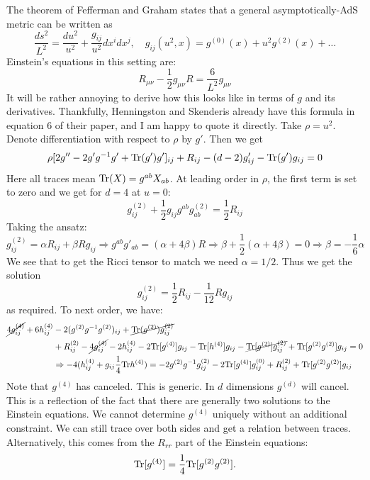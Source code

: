 \documentclass[11pt, class=article, crop=false]{standalone}
\begin{document}
\begin{enumerate}
	 The theorem of Fefferman and Graham states that a general asymptotically-AdS metric can be written as
	\[
		\frac{ds^2}{L^2} = \frac{du^2}{u^2} + \frac{g_{ij}}{u^2} dx^i dx^j, \quad g_{ij}(u^2, x) = g^{(0)}(x) + u^2 g^{(2)}(x) + \dots
	\]
	Einstein's equations in this setting are:
	\[
		R_{\mu \nu} - \frac12 g_{\mu \nu} R = \frac{6}{L^2} g_{\mu \nu}
	\]
	It will be rather annoying to derive how this looks like in terms of $g$ and its derivatives. Thankfully, Henningston and Skenderis already have this formula in equation 6 of their paper, and I am happy to quote it directly. Take $\rho = u^2$. Denote differentiation with respect to $\rho$ by $g'$. Then we get 
	\begin{equation}\label{eq:fefferman-graham}
		\rho [2 g'' - 2 g' g^{-1} g' + \mathrm{Tr}(g') g']_{ij} + R_{ij} - (d-2) g'_{ij} - \mathrm{Tr}(g') g_{ij} = 0
	\end{equation}
	Here all traces mean $\mathrm{Tr}(X) = g^{ab} X_{ab}$. 
	At leading order in $\rho$, the first term is set to zero and we get for $d=4$ at $u = 0$:
	\[
		 g^{(2)}_{ij} + \frac12 g_{ij} g^{ab} g^{(2)}_{ab}  = \frac12 R_{ij}
	\]
	Taking the ansatz:
	\[
		g^{(2)}_{ij}  = \alpha R_{ij} + \beta R g_{ij} \Rightarrow g^{ab} g'_{ab} = (\alpha + 4 \beta) R \Rightarrow \beta +\frac12 (\alpha  + 4 \beta) = 0 \Rightarrow \beta = - \frac16 \alpha
	\]
	We see that to get the Ricci tensor to match we need $\alpha = 1/2$. Thus we get the solution
	\[
		g^{(2)}_{ij}  = \frac12 R_{ij} - \frac{1}{12} R g_{ij}
	\]
	as required. To next order, we have:
	\begin{equation}\label{eq:hard}
		\begin{aligned}
			\cancel{4 g^{(4)}_{ij}} + 6 h^{(4)}_{ij} & - 2 (g^{(2)} g^{-1} g^{(2)})_{ij} + \cancel{\mathrm{Tr}(g^{(2)}) g^{(2)}_{ij}} \\
			& + R_{ij}^{(2)} - \cancel{4 g^{(4)}_{ij}} - 2 h_{ij}^{(4)} - 2 \mathrm{Tr}[g^{(4)}] g_{ij} - \mathrm{Tr}[h^{(4)}] g_{ij}  - \cancel{\mathrm{Tr}[g^{(2)}] g_{ij}^{(2)}} + \mathrm{Tr}[g^{(2)} g^{(2)}] g_{ij} = 0\\
			&\Rightarrow -4 (h^{(4)}_{ij} + g_{ij} \frac14 \mathrm{Tr} h^{(4)}) = - 2 g^{(2)} g^{-1} g^{(2)}_{ij} - 2\mathrm{Tr}[g^{(4)}] g_{ij}^{(0)} + R_{ij}^{(2)}  + \mathrm{Tr}[g^{(2)} g^{(2)}] g_{ij}
		\end{aligned}
	\end{equation}
	Note that $g^{(4)}$ has canceled. This is generic. In $d$ dimensions $g^{(d)}$ will cancel. This is a reflection of the fact that there are generally two solutions to the Einstein equations. We cannot determine $g^{(4)}$ uniquely without an additional constraint. We can still trace over both sides and get a relation between traces. Alternatively, this comes from the $R_{rr}$ part of the Einstein equations:
	\[
		\Tr[g^{(4)}] =  \frac14 \Tr[g^{(2)} g^{(2)}].  %
	\]
	

\end{enumerate}
\end{document}
